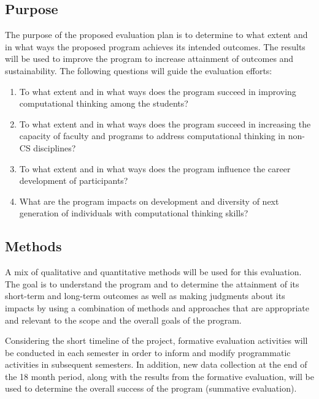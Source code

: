 \subsection{Purpose}
The purpose of the proposed evaluation plan is to determine to what extent and in what ways the proposed program achieves its intended outcomes. The results will be used to improve the program to increase attainment of outcomes and sustainability. The following questions will guide the evaluation efforts: 
\begin{enumerate}
\item To what extent and in what ways does the program succeed in improving computational thinking among the students? 
\item To what extent and in what ways does the program succeed in increasing the capacity of faculty and programs to address computational thinking in non-CS disciplines? 
\item To what extent and in what ways does the program influence the career development of participants?
\item What are the program impacts on development and diversity of next generation of individuals with computational thinking skills?
\end{enumerate}

\subsection{Methods}
A mix of qualitative and quantitative methods will be used for this evaluation. The goal is to understand the program and to determine the attainment of its short-term and long-term outcomes as well as making judgments about its impacts by using a combination of methods and approaches that are appropriate and relevant to the scope and the overall goals of the program.    

Considering the short timeline of the project, formative evaluation activities will be conducted in each semester in order to inform and modify programmatic activities in subsequent semesters. In addition, new data collection at the end of the 18 month period, along with the results from the formative evaluation, will be used to determine the overall success of the program (summative evaluation). 

